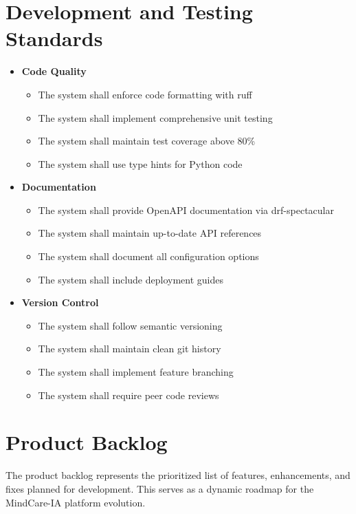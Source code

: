 \section{Development and Testing Standards}
\begin{itemize}
    \item \textbf{Code Quality}
    \begin{itemize}
        \item The system shall enforce code formatting with ruff
        \item The system shall implement comprehensive unit testing
        \item The system shall maintain test coverage above 80\%
        \item The system shall use type hints for Python code
    \end{itemize}
    
    \item \textbf{Documentation}
    \begin{itemize}
        \item The system shall provide OpenAPI documentation via drf-spectacular
        \item The system shall maintain up-to-date API references
        \item The system shall document all configuration options
        \item The system shall include deployment guides
    \end{itemize}
    
    \item \textbf{Version Control}
    \begin{itemize}
        \item The system shall follow semantic versioning
        \item The system shall maintain clean git history
        \item The system shall implement feature branching
        \item The system shall require peer code reviews
    \end{itemize}
\end{itemize}

\section{Product Backlog}
The product backlog represents the prioritized list of features, enhancements, and fixes planned for development. This serves as a dynamic roadmap for the MindCare-IA platform evolution.

